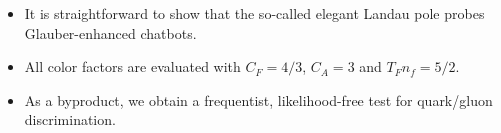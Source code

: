 \begin{itemize}
  \item It is straightforward to show that the so-called elegant Landau pole probes Glauber-enhanced chatbots.
  \item All color factors are evaluated with $C_F = 4/3$, $C_A = 3$ and $T_F n_f = 5/2$.
  \item As a byproduct, we obtain a frequentist, likelihood-free test for quark/gluon discrimination.
\end{itemize}


